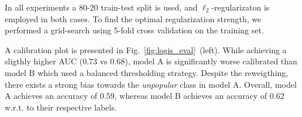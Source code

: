 \documentclass{article}
\begin{document}
In all experiments a 80-20 train-test split is used, and $\ell_2$-regularizaton is employed in both cases. To find the optimal regularization strength, we performed a grid-search using 5-fold cross validation on the training set.

A calibration plot is presented in Fig.~\ref{fig:logis_eval}~(left). While achieving a sligthly higher AUC ($0.73$ vs $0.68$), model A is significantly worse calibrated than model B which used a balanced thresholding strategy. Despite the reweigthing, there exists a strong bias towards the \emph{unpopular} class in model A. Overall, model A achieves an accuracy of $0.59$, whereas model B achieves an accuracy of $0.62$ w.r.t. to their respective labels.



\end{document}
